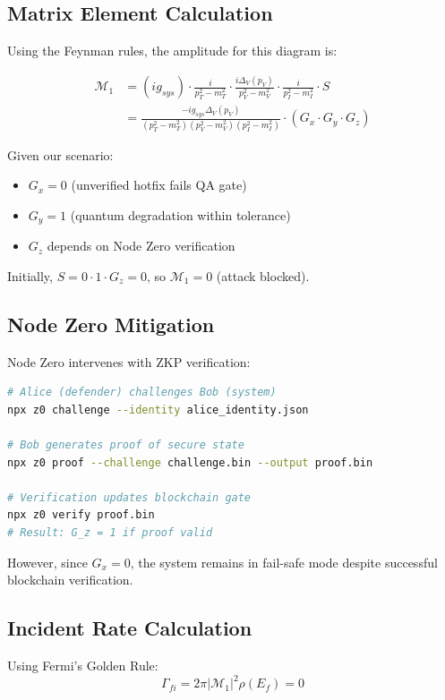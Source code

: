 \documentclass[11pt,a4paper]{article}
\begin{document}
\subsection{Matrix Element Calculation}

Using the Feynman rules, the amplitude for this diagram is:

\begin{align}
\mathcal{M}_1 &= (ig_{sys}) \cdot \frac{i}{p_T^2 - m_T^2} \cdot \frac{i\Delta_V(p_V)}{p_V^2 - m_V^2} \cdot \frac{i}{p_I^2 - m_I^2} \cdot S \\
&= \frac{-ig_{sys} \Delta_V(p_V)}{(p_T^2 - m_T^2)(p_V^2 - m_V^2)(p_I^2 - m_I^2)} \cdot (G_x \cdot G_y \cdot G_z)
\end{align}

Given our scenario:
\begin{itemize}
    \item $G_x = 0$ (unverified hotfix fails QA gate)
    \item $G_y = 1$ (quantum degradation within tolerance)
    \item $G_z$ depends on Node Zero verification
\end{itemize}

Initially, $S = 0 \cdot 1 \cdot G_z = 0$, so $\mathcal{M}_1 = 0$ (attack blocked).

\subsection{Node Zero Mitigation}

Node Zero intervenes with ZKP verification:
\begin{lstlisting}[language=bash, basicstyle=\small\ttfamily]
# Alice (defender) challenges Bob (system)
npx z0 challenge --identity alice_identity.json

# Bob generates proof of secure state
npx z0 proof --challenge challenge.bin --output proof.bin

# Verification updates blockchain gate
npx z0 verify proof.bin
# Result: G_z = 1 if proof valid
\end{lstlisting}

However, since $G_x = 0$, the system remains in fail-safe mode despite successful blockchain verification.

\subsection{Incident Rate Calculation}

Using Fermi's Golden Rule:
\begin{equation}
\Gamma_{fi} = 2\pi |\mathcal{M}_1|^2 \rho(E_f) = 0
\end{equation}
\end{document}
